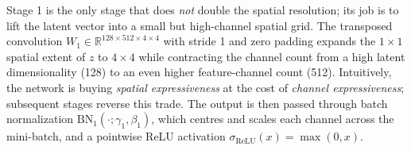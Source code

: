 
Stage 1 is the only stage that does \emph{not} double the spatial
resolution; its job is to lift the latent vector into a small but
high-channel spatial grid. The transposed convolution
$W_1 \in \mathbb{R}^{128 \times 512 \times 4 \times 4}$ with stride 1 and
zero padding expands the $1 \times 1$ spatial extent of $z$ to
$4 \times 4$ while contracting the channel count from a high latent
dimensionality (128) to an even higher feature-channel count (512).
Intuitively, the network is buying \emph{spatial expressiveness} at the
cost of \emph{channel expressiveness}; subsequent stages reverse this
trade. The output is then passed through batch normalization
$\mathrm{BN}_1(\cdot; \gamma_1, \beta_1)$, which centres and scales each
channel across the mini-batch, and a pointwise ReLU activation
$\sigma_{\mathrm{ReLU}}(x) = \max(0, x)$.
